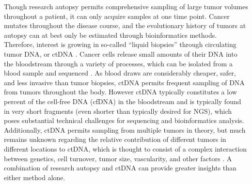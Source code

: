 Though research autopsy permits comprehensive sampling of large tumor volumes throughout a patient, it can only acquire samples at one time point. Cancer mutates throughout the disease course, and the evolutionary history of tumors at autopsy can at best only be estimated through bioinformatics methods. Therefore, interest is growing in so-called ``liquid biopsies'' through circulating tumor DNA, or ctDNA \cite{merker2018}. Cancer cells release small amounts of their DNA into the bloodstream through a variety of processes, which can be isolated from a blood sample and sequenced \cite{gilson2020}. As blood draws are considerably cheaper, safer, and less invasive than tumor biopsies, ctDNA permits frequent sampling of DNA from tumors throughout the body. However ctDNA typically constitutes a low percent of the cell-free DNA (cfDNA) in the bloodstream and is typically found in very short fragments (even shorter than typically desired for NGS), which poses substantial technical challenges for sequencing and bioinformatics analysis. Additionally, ctDNA permits sampling from multiple tumors in theory, but much remains unknown regarding the relative contribution of different tumors in different locations to ctDNA, which is thought to consist of a complex interaction between genetics, cell turnover, tumor size, vascularity, and other factors \cite{haber2014}. A combination of research autopsy and ctDNA can provide greater insights than either method alone.

